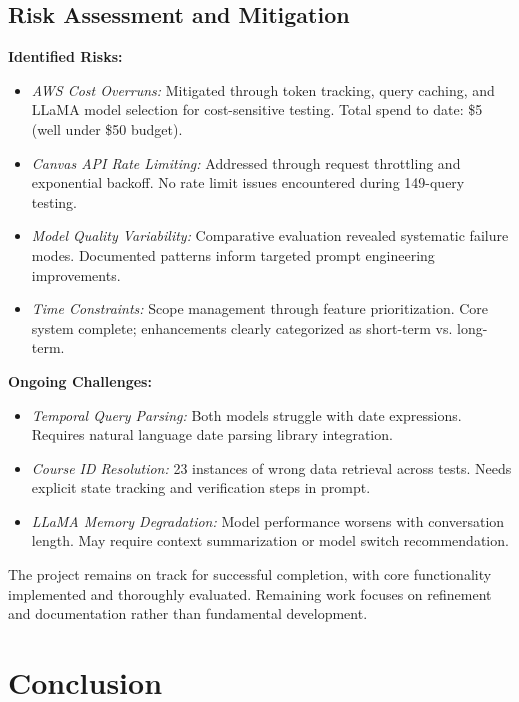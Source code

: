 \documentclass{article}
\begin{document}
\subsection{Risk Assessment and Mitigation}

\textbf{Identified Risks:}
\begin{itemize}
    \item \textit{AWS Cost Overruns:} Mitigated through token tracking, query caching, and LLaMA model selection for cost-sensitive testing. Total spend to date: \$5 (well under \$50 budget).
    
    \item \textit{Canvas API Rate Limiting:} Addressed through request throttling and exponential backoff. No rate limit issues encountered during 149-query testing.
    
    \item \textit{Model Quality Variability:} Comparative evaluation revealed systematic failure modes. Documented patterns inform targeted prompt engineering improvements.
    
    \item \textit{Time Constraints:} Scope management through feature prioritization. Core system complete; enhancements clearly categorized as short-term vs. long-term.
\end{itemize}

\textbf{Ongoing Challenges:}
\begin{itemize}
    \item \textit{Temporal Query Parsing:} Both models struggle with date expressions. Requires natural language date parsing library integration.
    
    \item \textit{Course ID Resolution:} 23 instances of wrong data retrieval across tests. Needs explicit state tracking and verification steps in prompt.
    
    \item \textit{LLaMA Memory Degradation:} Model performance worsens with conversation length. May require context summarization or model switch recommendation.
\end{itemize}

The project remains on track for successful completion, with core functionality implemented and thoroughly evaluated. Remaining work focuses on refinement and documentation rather than fundamental development.


\section{Conclusion}
\end{document}
